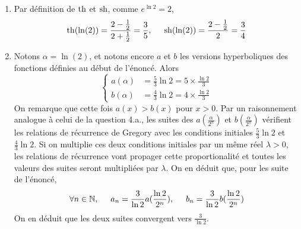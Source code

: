\begin{enumerate}
\begin{enumerate}
  \item Par définition de $\operatorname{th}$ et $\operatorname{sh}$, comme $e^{\ln 2} = 2$,
\begin{displaymath}
\operatorname{th}(\ln(2)) = \frac{2-\frac{1}{2}}{2+\frac{1}{2}} = \frac{3}{5},\hspace{0.5cm}
\operatorname{sh}(\ln(2)) = \frac{2-\frac{1}{2}}{2} = \frac{3}{4}
\end{displaymath}

  \item Notons $\alpha = \ln(2)$, et notons encore $a$ et $b$ les versions hyperboliques des fonctions définies au début de l'énoncé. Alors 
\begin{displaymath}
\left\lbrace 
\begin{aligned}
a(\alpha) &= \frac{5}{3}\ln 2 = 5 \times \frac{\ln 2}{3}\\
b(\alpha) &= \frac{4}{3}\ln 2 = 4 \times \frac{\ln 2}{3} 
\end{aligned}
\right. 
\end{displaymath}
On remarque que cette fois $a(x)>b(x)$ pour $x>0$.\newline
Par un raisonnement analogue à celui de la question 4.a., les suites des $a(\frac{\alpha}{2^n})$ et  $b(\frac{\alpha}{2^n})$ vérifient les relations de récurrence de Gregory avec les conditions initiales $\frac{5}{3}\ln 2$ et $\frac{4}{3}\ln 2$.\newline
Si on multiplie ces deux conditions initiales par un même réel $\lambda >0$, les relations de récurrence vont propager cette proportionalité et toutes les valeurs des suites seront multipliées par $\lambda$. On en déduit que, pour les suite de l'énoncé,
\begin{displaymath}
\forall n \in \mathbb{N},\hspace{0.5cm} a_n = \frac{3}{\ln 2}a(\frac{\ln 2}{2^n}),\hspace{0.5cm}  b_n = \frac{3}{\ln 2}b(\frac{\ln 2}{2^n})
\end{displaymath}
On en déduit que les deux suites convergent vers $\frac{3}{\ln 2}$.
\end{enumerate}
\end{enumerate}
